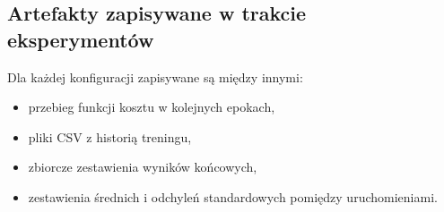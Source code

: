 \subsection{Artefakty zapisywane w trakcie eksperymentów}

Dla każdej konfiguracji zapisywane są między innymi:
\begin{itemize}
    \item przebieg funkcji kosztu w kolejnych epokach,
    \item pliki CSV z historią treningu,
    \item zbiorcze zestawienia wyników końcowych,
    \item zestawienia średnich i odchyleń standardowych pomiędzy uruchomieniami.
\end{itemize}
